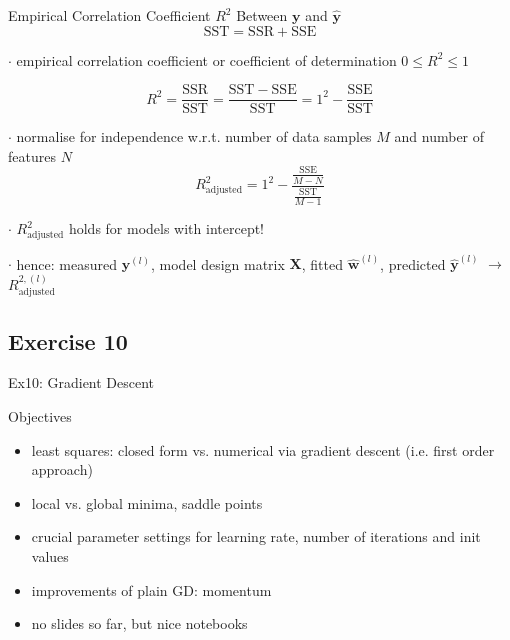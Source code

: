 \documentclass[mathserif, aspectratio=1610]{intbeamer}
\begin{document}
\begin{frame}[t]{Empirical Correlation Coefficient $R^2$ Between $\mathbf{y}$ and  $\hat{\mathbf{y}}$}
\vspace{-1em}
$$\mathrm{SST} = \mathrm{SSR} + \mathrm{SSE}$$

$\cdot$ empirical correlation coefficient or coefficient of determination $0 \leq R^2 \leq 1$

$$R^2 = \frac{\mathrm{SSR}}{\mathrm{SST}} = \frac{\mathrm{SST}-\mathrm{SSE}}{\mathrm{SST}} = 1^2 - \frac{\mathrm{SSE}}{\mathrm{SST}}$$

$\cdot$ normalise for independence w.r.t. number of data samples $M$ and number of features $N$
$$R_\text{adjusted}^2 = 1^2 - \frac{\frac{\mathrm{SSE}}{M-N}}{\frac{\mathrm{SST}}{M-1}}$$

$\cdot$ $R_\text{adjusted}^2$ holds for models with intercept!

\vspace{1em}

$\cdot$ hence: measured $\bm{y}^{(l)}$, model design matrix $\bm{X}$, fitted $\hat{\bm{w}}^{(l)}$, predicted $\hat{\bm{y}}^{(l)}$ $\rightarrow$ $R_\text{adjusted}^{2,(l)}$

\end{frame}
















\subsection{Exercise 10}
\begin{frame}{Ex10: Gradient Descent}

Objectives
\begin{itemize}
\item least squares: closed form vs. numerical via gradient descent (i.e. first order approach)
\item local vs. global minima, saddle points
\item crucial parameter settings for learning rate, number of iterations and init values
\item improvements of plain GD: momentum
\item no slides so far, but nice notebooks
\end{itemize}



\end{frame}
\end{document}
